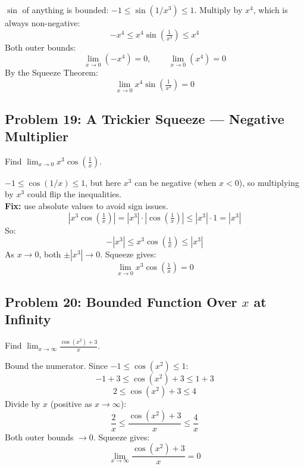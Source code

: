 \documentclass[11pt, letterpaper]{article}
\begin{document}
\begin{tcolorbox}[colback=examplebg, colframe=exampleborder,
  title={\bfseries Solution}, arc=3pt, boxrule=1pt]
$\sin$ of anything is bounded: $-1 \leq \sin(1/x^3) \leq 1$. Multiply by $x^4$, which is always non-negative:
\[
-x^4 \leq x^4 \sin\!\left(\tfrac{1}{x^3}\right) \leq x^4
\]
Both outer bounds:
\[
\lim_{x \to 0}(-x^4) = 0, \qquad \lim_{x \to 0}(x^4) = 0
\]
By the Squeeze Theorem:
\[
\lim_{x \to 0} x^4 \sin\!\left(\tfrac{1}{x^3}\right) = 0
\]
\end{tcolorbox}

\subsection*{Problem 19: A Trickier Squeeze --- Negative Multiplier}

Find $\displaystyle \lim_{x \to 0} x^3 \cos\!\left(\frac{1}{x}\right)$.

\begin{tcolorbox}[colback=examplebg, colframe=exampleborder,
  title={\bfseries Solution}, arc=3pt, boxrule=1pt]
$-1 \leq \cos(1/x) \leq 1$, but here $x^3$ can be negative (when $x < 0$), so multiplying by $x^3$ could flip the inequalities.\\[3pt]
\textbf{Fix:} use absolute values to avoid sign issues.
\[
\left| x^3 \cos\!\left(\tfrac{1}{x}\right) \right| = |x^3| \cdot \left|\cos\!\left(\tfrac{1}{x}\right)\right| \leq |x^3| \cdot 1 = |x^3|
\]
So:
\[
-|x^3| \leq x^3 \cos\!\left(\tfrac{1}{x}\right) \leq |x^3|
\]
As $x \to 0$, both $\pm|x^3| \to 0$. Squeeze gives:
\[
\lim_{x \to 0} x^3 \cos\!\left(\tfrac{1}{x}\right) = 0
\]
\end{tcolorbox}

\subsection*{Problem 20: Bounded Function Over $x$ at Infinity}

Find $\displaystyle \lim_{x \to \infty} \frac{\cos(x^2) + 3}{x}$.

\begin{tcolorbox}[colback=examplebg, colframe=exampleborder,
  title={\bfseries Solution}, arc=3pt, boxrule=1pt]
Bound the numerator. Since $-1 \leq \cos(x^2) \leq 1$:
\[
-1 + 3 \leq \cos(x^2) + 3 \leq 1 + 3
\]
\[
2 \leq \cos(x^2) + 3 \leq 4
\]
Divide by $x$ (positive as $x \to \infty$):
\[
\frac{2}{x} \leq \frac{\cos(x^2) + 3}{x} \leq \frac{4}{x}
\]
Both outer bounds $\to 0$. Squeeze gives:
\[
\lim_{x \to \infty} \frac{\cos(x^2) + 3}{x} = 0
\]
\end{tcolorbox}
\end{document}
